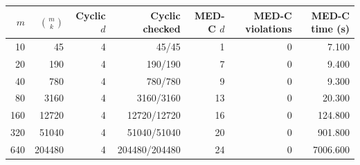 \begin{tabular}{rrrrrrr}
\toprule
$m$ & $\binom{m}{k}$ & Cyclic $d$ & Cyclic checked & MED-C $d$ & MED-C violations & MED-C time (s) \\
\midrule
10 & 45 & 4 & 45/45 & 1 & 0 & 7.100 \\
20 & 190 & 4 & 190/190 & 7 & 0 & 9.400 \\
40 & 780 & 4 & 780/780 & 9 & 0 & 9.300 \\
80 & 3160 & 4 & 3160/3160 & 13 & 0 & 20.300 \\
160 & 12720 & 4 & 12720/12720 & 16 & 0 & 124.800 \\
320 & 51040 & 4 & 51040/51040 & 20 & 0 & 901.800 \\
640 & 204480 & 4 & 204480/204480 & 24 & 0 & 7006.600 \\
\bottomrule
\end{tabular}
